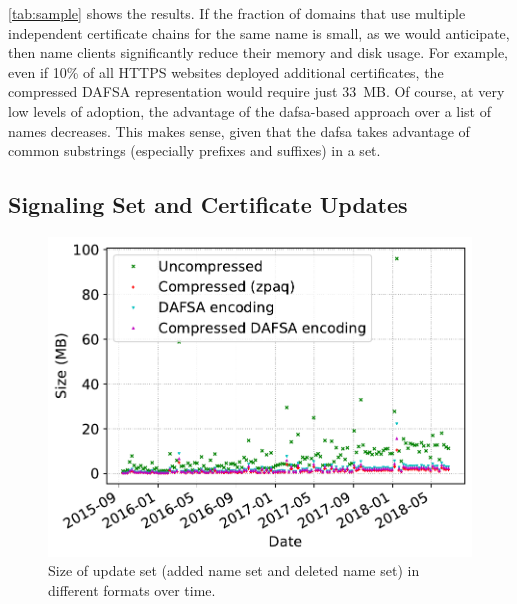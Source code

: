 \autoref{tab:sample} shows the results. If the fraction of domains that use
multiple independent certificate chains for the same name is small, as we would
anticipate, then \ac{name} clients significantly reduce their memory and disk
usage. For example, even if 10\% of all HTTPS websites deployed additional
certificates, the compressed DAFSA representation would require just 33~MB. Of
course, at very low levels of adoption, the advantage of the \ac{dafsa}-based
approach over a list of names decreases. This makes sense, given that the
\ac{dafsa} takes advantage of common substrings (especially prefixes and
suffixes) in a set.

\subsection{Signaling Set and Certificate Updates}
\label{sec:evaluation:updates}


\begin{figure}[t]
  \centering
  \includegraphics[width=0.95\linewidth]{fig/combined_update_size}
  \caption{Size of update set (added name set and deleted name set) in different
  formats over time.}
  \label{fig:updates}
\end{figure}

